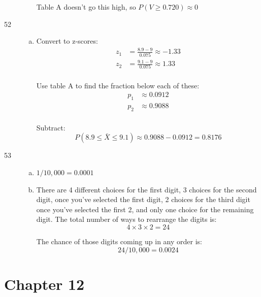 \documentclass[letterpaper]{exam}
\begin{document}
\begin{description}
\begin{enumerate}[(a)]
            Table A doesn't go this high, so $P(V \geq 0.720) \approx 0$
        \end{enumerate}  

      \item[52]
        \begin{enumerate}[(a)]
          \item Convert to z-scores:
            \begin{align*}
              z_1 & = \frac{8.9 - 9}{0.075} \approx -1.33 \\
              z_2 & = \frac{9.1 - 9}{0.075} \approx 1.33 \\
            \end{align*}

            Use table A to find the fraction below each of these:
            \begin{align*}
              p_1 &\approx 0.0912 \\
              p_2 &\approx 0.9088 \\
            \end{align*}

            Subtract:
            \[
              P(8.9 \leq \bar{X} \leq 9.1) \approx 0.9088 - 0.0912 = \boxed{ 0.8176 }
            \]
          \end{enumerate}

        \item[53]
          \begin{enumerate}[(a)]
            \item $1/10,000 = \boxed{ 0.0001 }$

            \item There are 4 different choices for the first digit, 3 choices
              for the second digit, once you've selected the first digit, 2
              choices for the third digit once you've selected the first 2, and
              only one choice for the remaining digit. The total number of ways
              to rearrange the digits is:
              \[
                4 \times 3 \times 2 = 24
              \]

              The chance of those digits coming up in any order is:
              \[
                24 / 10,000 = \boxed{ 0.0024 }
              \]
          \end{enumerate}

  \end{description}

  \section{Chapter 12} %
  
\end{document}
